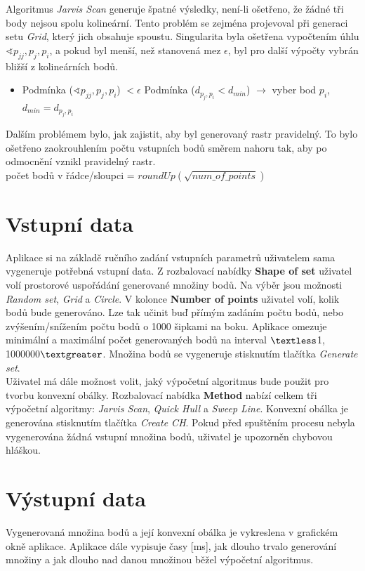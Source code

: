 \documentclass[a4paper, 12pt]{article}
\begin{document}
Algoritmus \textit{Jarvis Scan} generuje špatné výsledky, není-li ošetřeno, že žádné tři body nejsou spolu kolineární. Tento problém se zejména projevoval při generaci setu \textit{Grid}, který jich obsahuje spoustu. Singularita byla ošetřena vypočtením úhlu $\sphericalangle p_{jj}, p_j, p_i$, a pokud byl menší, než stanovená mez $\epsilon$, byl pro další výpočty vybrán bližší z kolineárních bodů.

\begin{itemize}
\item Podmínka ($\sphericalangle p_{jj}, p_j, p_i$) $< \epsilon$
\subitem Podmínka ($d_{p_j,p_i} < d_{min}$) $\rightarrow$ vyber bod $p_i$, $d_{min} = d_{p_j,p_i}$
\end{itemize}

Dalším problémem bylo, jak zajistit, aby byl generovaný rastr pravidelný. To bylo ošetřeno zaokrouhlením počtu vstupních bodů směrem nahoru tak, aby po odmocnění vznikl pravidelný rastr.\\

počet bodů v řádce/sloupci = $roundUp(\sqrt{num\_of\_points})$

\section{Vstupní data}
Aplikace si na základě ručního zadání vstupních parametrů uživatelem sama vygeneruje potřebná vstupní data. Z rozbalovací nabídky \textbf{Shape of set} uživatel volí prostorové uspořádání generované množiny bodů. Na výběr jsou možnosti \textit{Random set}, \textit{Grid} a \textit{Circle}. V kolonce \textbf{Number of points} uživatel volí, kolik bodů bude generováno. Lze tak učinit buď přímým zadáním počtu bodů, nebo zvýšením/snížením počtu bodů o 1000 šipkami na boku. Aplikace omezuje minimální a maximální počet generovaných bodů na interval $\textless$1, 1000000$\textgreater$. Množina bodů se vygeneruje stisknutím tlačítka \textsl{Generate set}.\\

Uživatel má dále možnost volit, jaký výpočetní algoritmus bude použit pro tvorbu konvexní obálky. Rozbalovací nabídka \textbf{Method} nabízí celkem tři výpočetní algoritmy: \textit{Jarvis Scan}, \textit{Quick Hull} a \textit{Sweep Line}. Konvexní obálka je generována stisknutím tlačítka \textsl{Create CH}. Pokud před spuštěním procesu nebyla vygenerována žádná vstupní množina bodů, uživatel je upozorněn chybovou hláškou. 

\section{Výstupní data}
Vygenerovaná množina bodů a její konvexní obálka je vykreslena v grafickém okně aplikace. Aplikace dále vypisuje časy [ms], jak dlouho trvalo generování množiny a jak dlouho nad danou množinou běžel výpočetní algoritmus.\\
\end{document}
